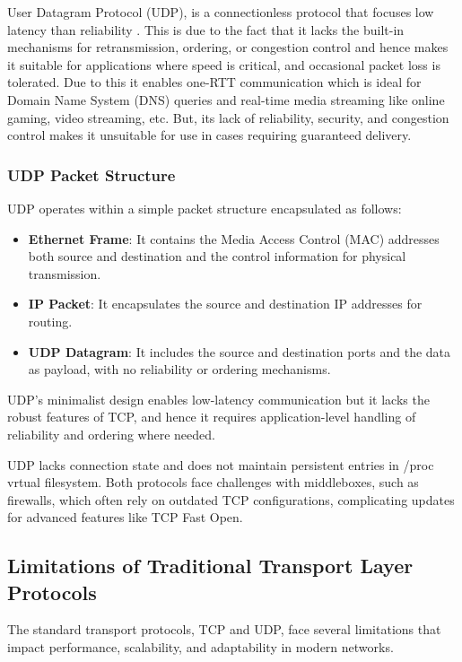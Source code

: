 User Datagram Protocol (UDP), is a connectionless protocol that focuses low latency than reliability \cite{kurose2017}. This is due to the fact that it lacks the built-in mechanisms for retransmission, ordering, or congestion control and hence makes it suitable for applications where speed is critical, and occasional packet loss is tolerated. Due to this it enables one-RTT communication which is ideal for Domain Name System (DNS) queries \cite{kurose2017} and real-time media streaming like online gaming, video streaming, etc. But, its lack of reliability, security, and congestion control makes it unsuitable for use in cases requiring guaranteed delivery.

\subsubsection{UDP Packet Structure}

UDP operates within a simple packet structure encapsulated as follows:

\begin{itemize}
    \item \textbf{Ethernet Frame}: It contains the Media Access Control (MAC) addresses both source and destination and the control information for physical transmission.
    \item \textbf{IP Packet}: It encapsulates the source and destination IP addresses for routing.
    \item \textbf{UDP Datagram}: It includes the source and destination ports and the data as payload, with no reliability or ordering mechanisms.
\end{itemize}

UDP’s minimalist design enables low-latency communication but it lacks the robust features of TCP, and hence it requires application-level handling of reliability and ordering where needed.

UDP lacks connection state and does not maintain persistent entries in /proc vrtual filesystem. Both protocols face challenges with middleboxes, such as firewalls, which often rely on outdated TCP configurations, complicating updates for advanced features like TCP Fast Open.

\subsection{Limitations of Traditional Transport Layer Protocols}

The standard transport protocols, TCP and UDP, face several limitations that impact performance, scalability, and adaptability in modern networks.

